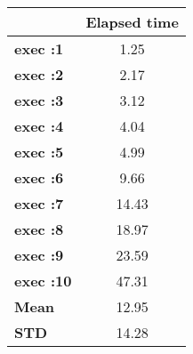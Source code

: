 \begin{tiny}\begin{tabular}{|l|c|}
\hline
&\textbf{Elapsed time}\\\hline
\textbf{exec :1}&1.25\\\hline
\textbf{exec :2}&2.17\\\hline
\textbf{exec :3}&3.12\\\hline
\textbf{exec :4}&4.04\\\hline
\textbf{exec :5}&4.99\\\hline
\textbf{exec :6}&9.66\\\hline
\textbf{exec :7}&14.43\\\hline
\textbf{exec :8}&18.97\\\hline
\textbf{exec :9}&23.59\\\hline
\textbf{exec :10}&47.31\\\hline
\textbf{ Mean}&12.95\\\hline
\textbf{ STD}&14.28\\\hline
\end{tabular}
\end{tiny}